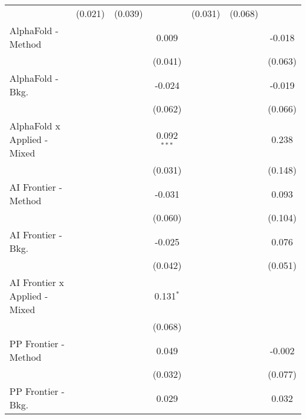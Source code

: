 \begin{tabular}{lcccccc}
                                  & (0.021)      & (0.039)      &               & (0.031)       & (0.068)      &   \\   
   AlphaFold - Method             &              &              & 0.009         &               &              & -0.018\\   
                                  &              &              & (0.041)       &               &              & (0.063)\\   
   AlphaFold - Bkg.               &              &              & -0.024        &               &              & -0.019\\   
                                  &              &              & (0.062)       &               &              & (0.066)\\   
   AlphaFold x Applied - Mixed    &              &              & 0.092$^{***}$ &               &              & 0.238\\   
                                  &              &              & (0.031)       &               &              & (0.148)\\   
   AI Frontier - Method           &              &              & -0.031        &               &              & 0.093\\   
                                  &              &              & (0.060)       &               &              & (0.104)\\   
   AI Frontier - Bkg.             &              &              & -0.025        &               &              & 0.076\\   
                                  &              &              & (0.042)       &               &              & (0.051)\\   
   AI Frontier x Applied - Mixed  &              &              & 0.131$^{*}$   &               &              &   \\   
                                  &              &              & (0.068)       &               &              &   \\   
   PP Frontier - Method           &              &              & 0.049         &               &              & -0.002\\   
                                  &              &              & (0.032)       &               &              & (0.077)\\   
   PP Frontier - Bkg.             &              &              & 0.029         &               &              & 0.032\\   

\end{tabular}
